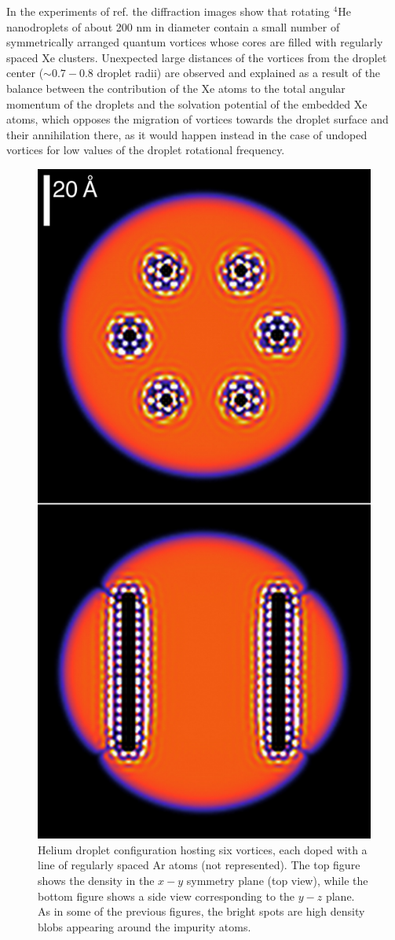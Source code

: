 In the experiments of ref. \cite{Jon16} the diffraction images 
show that rotating $^4$He nanodroplets of about 200 nm in diameter 
contain a small number of symmetrically arranged quantum 
vortices whose cores are filled with regularly spaced 
Xe clusters. Unexpected large distances 
of the vortices from the droplet center ($\sim 0.7-0.8$ droplet radii) 
are observed and explained as a result of the balance between 
the contribution of the Xe atoms to the total angular momentum of the droplets and 
the solvation potential of the embedded Xe atoms, which opposes the migration of vortices
towards the droplet surface and their annihilation there, as it would
happen instead in the case of undoped vortices for low values of the
droplet rotational frequency.

\begin{figure}[!]
\centerline{\includegraphics[width=0.6\linewidth,clip]{fig13}}
\caption{\label{fig13} 
Helium droplet configuration hosting six vortices, each doped with a line of 
regularly spaced Ar atoms (not represented). 
The top figure shows the density in the $x-y$
symmetry plane (top view), while the bottom figure shows a side view corresponding to the 
$y-z$ plane. 
As in some of the previous figures, the bright  spots are high density blobs appearing around the impurity atoms.
}
\end{figure}

